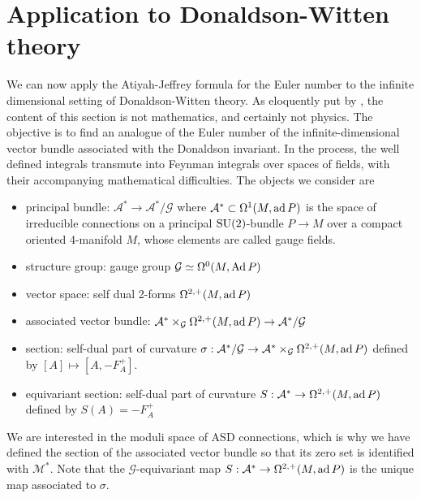 \section{Application to Donaldson-Witten theory}
We can now apply the Atiyah-Jeffrey formula for the Euler number to the infinite 
dimensional setting of Donaldson-Witten theory. As eloquently put by \citet{naber},
the content of this section is not mathematics, and certainly not physics. The
objective is to find an analogue of the Euler number of the
infinite-dimensional vector bundle associated with the Donaldson invariant. In
the process, the well defined integrals transmute into Feynman integrals
over spaces of fields, with their accompanying mathematical difficulties.  
The objects we consider are 
\begin{itemize}
	\item principal bundle: $\mathcal{A}^* \to \mathcal{A}^* /\mathcal{G}$ where 
	$\mathcal{A}^* \subset \Omega^1(M,\operatorname{ad} P)$ is the
	space of irreducible connections   on a principal $\operatorname{SU}(2)$-bundle  $P\to M$
	over a compact oriented 4-manifold $M$, whose elements are called gauge
	fields.
	\item structure group: gauge group $\mathcal{G}\simeq \Omega^0(M,\operatorname{Ad} P)$
	\item vector space: self dual 2-forms $\Omega^{2,+}(M,\operatorname{ad} P)$ 
	\item associated vector bundle: $\mathcal{A}^* \times_\mathcal{G}
		\Omega^{2,+}(M,\operatorname{ad} P)  \to \mathcal{A}^* /\mathcal{G}$
	\item section: self-dual part of curvature 
		$\sigma : \mathcal{A}^* /\mathcal{G} \to \mathcal{A}^*\times_\mathcal{G}
\Omega^{2,+}(M,\operatorname{ad} P)$ defined by $[A]\mapsto [A,-F_A^+]$.
	\item equivariant section: self-dual part of curvature $S : \mathcal{A}^* \to
		\Omega^{2,+}(M,\operatorname{ad} P)$ defined by $S(A)=-F_A^+$
\end{itemize}

We are interested in the moduli space of ASD connections, which is why we
have defined the section of the associated vector bundle so that its zero set
is identified with $\mathcal{M}^*$. Note that the 
$\mathcal{G}$-equivariant map $S : \mathcal{A}^* \to
\Omega^{2,+}(M,\operatorname{ad} P)$ is the unique map associated to $\sigma$.

